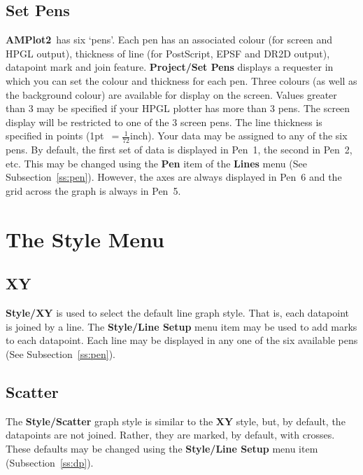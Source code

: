 \documentclass{report}
\newcommand{\amplot}{{\bf AMPlot2}}
\begin{document}
\subsection{Set Pens}
\amplot\ has six `pens'. Each pen has an associated colour (for 
screen and HPGL output), thickness of line (for PostScript, EPSF and DR2D output), 
datapoint mark and join feature.
{\bf Project/Set Pens} displays a requester in which you can set the colour and 
thickness for each pen. Three colours (as well as the background colour) are 
available for display on the screen. Values greater than 3 may be specified if your 
HPGL plotter has more than 3 pens. The screen display will be restricted to one of 
the 3 screen pens. The line thickness is specified in points 
(1pt~$=\frac{1}{72}$inch). Your data may be assigned to any of the six pens. By 
default, the first set of data is displayed in Pen~1, the second in Pen~2, etc.
This may be changed using the {\bf Pen} item of the {\bf Lines} menu (See 
Subsection~\ref{ss:pen}).
However, the axes are always displayed in Pen~6 and the grid across the graph is 
always in Pen~5.



\section{The Style Menu}


\subsection{XY}
{\bf Style/XY}  is used to select the default 
line graph style. That is, each datapoint is joined by a line. 
The {\bf Style/Line Setup} menu item may be used to add marks to each 
datapoint. Each line may be displayed in any one of the six available pens (See 
Subsection~\ref{ss:pen}).


\subsection{Scatter}
The {\bf Style/Scatter}  graph style is similar to the {\bf XY} style, 
but, by default, the datapoints are not joined. Rather, they are marked, by default, 
with crosses. 
These defaults may be changed using the {\bf Style/Line Setup} menu item 
(Subsection~\ref{ss:dp}).
\end{document}
